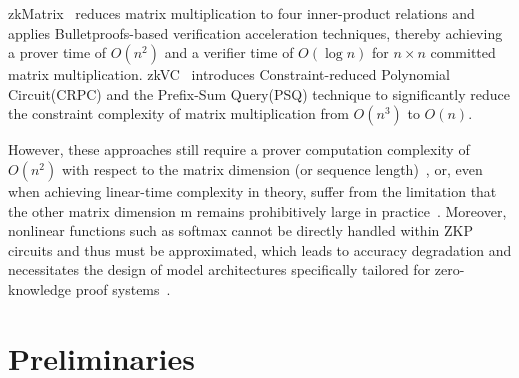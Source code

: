 \documentclass[letterpaper,twocolumn,10pt]{article}
\begin{document}
zkMatrix~\cite{zkMatrix} reduces matrix multiplication to four inner-product relations and applies Bulletproofs-based verification acceleration techniques, thereby achieving a prover time of $O(n^2)$ and a verifier time of $O(\log n)$ for $n \times n$ committed matrix multiplication.
zkVC~\cite{zkVC} introduces Constraint-reduced Polynomial Circuit(CRPC) and the Prefix-Sum
Query(PSQ) technique to significantly reduce the constraint complexity of matrix multiplication from $O(n^3)$ to $O(n)$. 

However, these approaches still require a prover computation complexity of $O(n^2)$ with respect to the matrix dimension (or sequence length)~\cite{Thaler, zkCNN, vCNN, zkML, zkMatrix}, or, even when achieving linear-time complexity in theory, suffer from the limitation that the other matrix dimension m remains prohibitively large in practice~\cite{zkLLM}. Moreover, nonlinear functions such as softmax cannot be directly handled within ZKP circuits and thus must be approximated, which leads to accuracy degradation and necessitates the design of model architectures specifically tailored for zero-knowledge proof systems~\cite{zkVC}.

\section{Preliminaries}
\label{sec:preliminaries}
\end{document}
